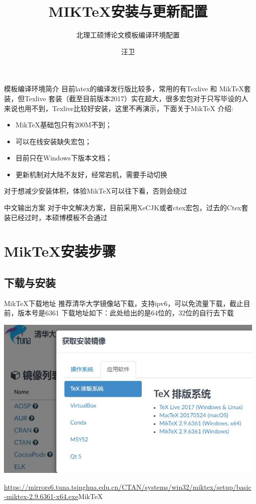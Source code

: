 \documentclass[sectioncirclenumberstyle]{le2iutbmbeamer}
\title{MIK\TeX{}安装与更新配置}
\subtitle{ 北理工硕博论文模板编译环境配置}
\author[汪卫]{汪卫}
\institute[BIT]{北京理工大学宇航学院}
\begin{document}
\begin{frame}{模板编译环境简介}
目前latex的编译发行版比较多，常用的有Texlive 和 Mik\TeX{}套装，但Texlive 套装（截至目前版本2017）实在超大，很多宏包对于只写毕设的人来说也用不到，Texlive比较好安装，这里不再演示，下面关于Mik\TeX{} 介绍:
\begin{itemize}
    \item  Mik\TeX{}基础包只有200M不到；
    \item  可以在线安装缺失宏包；
    \item 目前只在Windows下版本文档；
    \item 更新机制对大陆不友好，经常宕机，需要手动切换
\end{itemize}
\alert{对于想减少安装体积，体验Mik\TeX{}可以往下看，否则会绕过}
\begin{alertblock}{中文输出方案}
对于中文解决方案，目前采用XeCJK或者ctex宏包，过去的Ctex套装已经过时，本硕博模板不会通过
\end{alertblock}
\end{frame}


\tableofcontentslide

\section{Mik\TeX{}安装步骤}
\subsection{下载与安装}
\begin{frame}{Mik\TeX{}下载地址}
		推荐清华大学镜像站下载，支持ipv6，可以免流量下载，截止目前，版本号是6361
       下载地址如下：\alert{此处给出的是64位的，32位的自行去下载}
   
    \includegraphics[width=0.7\linewidth]{figures/11}
    
       \url{https://mirrors6.tuna.tsinghua.edu.cn/CTAN/systems/win32/miktex/setup/basic-miktex-2.9.6361-x64.exe}{Mik\TeX}
       
\end{frame}
\end{document}
